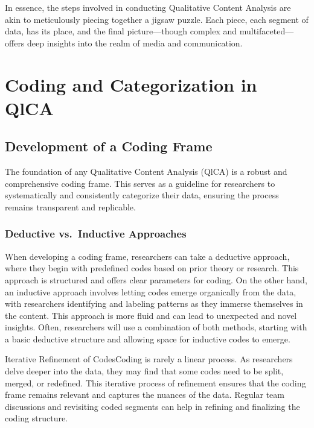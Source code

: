 \documentclass[
  b5paper]{book}
\begin{document}
In essence, the steps involved in conducting Qualitative Content Analysis are akin to meticulously piecing together a jigsaw puzzle. Each piece, each segment of data, has its place, and the final picture---though complex and multifaceted---offers deep insights into the realm of media and communication.

\hypertarget{coding-and-categorization-in-qlca}{%
\section{Coding and Categorization in QlCA}\label{coding-and-categorization-in-qlca}}

\hypertarget{development-of-a-coding-frame}{%
\subsection*{Development of a Coding Frame}\label{development-of-a-coding-frame}}

The foundation of any Qualitative Content Analysis (QlCA) is a robust and comprehensive coding frame. This serves as a guideline for researchers to systematically and consistently categorize their data, ensuring the process remains transparent and replicable.

\hypertarget{deductive-vs.-inductive-approaches}{%
\subsubsection*{Deductive vs.~Inductive Approaches}\label{deductive-vs.-inductive-approaches}}

When developing a coding frame, researchers can take a deductive approach, where they begin with predefined codes based on prior theory or research. This approach is structured and offers clear parameters for coding. On the other hand, an inductive approach involves letting codes emerge organically from the data, with researchers identifying and labeling patterns as they immerse themselves in the content. This approach is more fluid and can lead to unexpected and novel insights. Often, researchers will use a combination of both methods, starting with a basic deductive structure and allowing space for inductive codes to emerge.

Iterative Refinement of CodesCoding is rarely a linear process. As researchers delve deeper into the data, they may find that some codes need to be split, merged, or redefined. This iterative process of refinement ensures that the coding frame remains relevant and captures the nuances of the data. Regular team discussions and revisiting coded segments can help in refining and finalizing the coding structure.
\end{document}
